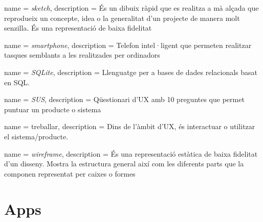 {
name = \textit{sketch}, description = {És un dibuix ràpid que es realitza a mà alçada que reprodueix un concepte, idea o la generalitat d'un projecte de manera molt senzilla. És una representació de baixa fidelitat} 
}

{
name = \textit{smartphone}, description = {Telefon intel·ligent que permeten realitzar tasques semblants a les realitzades per ordinadors} 
}

{
name = \textit{SQLite}, description = {Llenguatge per a bases de dades relacionals basat en SQL.} 
}

{
name = \textit{SUS}, description = {Qüestionari d'UX amb 10 preguntes que permet puntuar un producte o sistema} 
}

{
name = treballar, description = {Dins de l'àmbit d'UX, és interactuar o utilitzar el sistema/producte.} 
}

{
name = \textit{wireframe}, description = {És una representació estàtica de baixa fidelitat d'un disseny. Mostra la estructura general així com les diferents parts que la componen representat per caixes o formes}
}




\printglossary


\chapter*{Apps}
\label{sec:apps}

